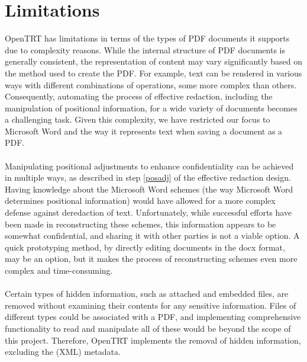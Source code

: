 \section{Limitations}
OpenTRT has limitations in terms of the types of PDF documents it supports due to complexity reasons. While the internal structure of PDF documents is generally consistent, the representation of content may vary significantly based on the method used to create the PDF. For example, text can be rendered in various ways with different combinations of operations, some more complex than others. Consequently, automating the process of effective redaction, including the manipulation of positional information, for a wide variety of documents becomes a challenging task. Given this complexity, we have restricted our focus to Microsoft Word and the way it represents text when saving a document as a PDF.
\\\\
Manipulating positional adjustments to enhance confidentiality can be achieved in multiple ways, as described in step \ref{posadj} of the effective redaction design. Having knowledge about the Microsoft Word schemes (the way Microsoft Word determines positional information) would have allowed for a more complex defense against deredaction of text. Unfortunately, while successful efforts have been made in reconstructing these schemes, this information appears to be somewhat confidential, and sharing it with other parties is not a viable option. A quick prototyping method, by directly editing documents in the docx format, may be an option, but it makes the process of reconstructing schemes even more complex and time-consuming. 
\\\\
Certain types of hidden information, such as attached and embedded files, are removed without examining their contents for any sensitive information. Files of different types could be associated with a PDF, and implementing comprehensive functionality to read and manipulate all of these would be beyond the scope of this project. Therefore, OpenTRT implements the removal of hidden information, excluding the (XML) metadata.
